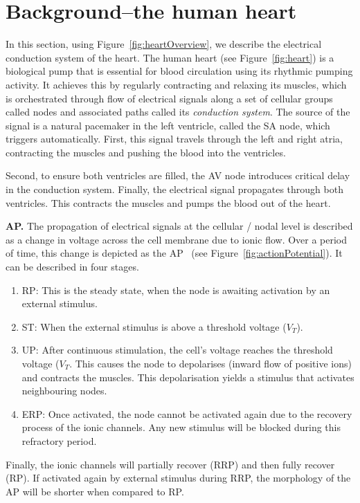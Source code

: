 \section{Background--the human heart }

In this section, using Figure~\ref{fig:heartOverview}, we describe the
electrical conduction system of the heart.
The human heart (see Figure~\ref{fig:heart}) is a biological pump that
is essential for blood circulation using its rhythmic pumping activity.
It achieves this by regularly contracting and relaxing its muscles,
which is orchestrated through flow of electrical signals along a set of
cellular groups called nodes and associated paths called its
\emph{conduction system}. The source of the signal is a natural pacemaker in the left ventricle, called the \ac{SA} node, which triggers
automatically. First, this signal travels through the left and right
atria, contracting the muscles and pushing the blood into the
ventricles.

Second, to ensure both ventricles are filled, the \ac{AV} node
introduces critical delay in the conduction system. Finally, the
electrical signal propagates through both ventricles. This contracts the
muscles and pumps the blood out of the heart.

\noindent \textbf{\acf{AP}.} The propagation of electrical signals at
the cellular / nodal level is described as a change in voltage across
the cell membrane due to ionic flow. Over a period of time, this change
is depicted as the \acf{AP}~\cite{chen14} (see 
Figure~\ref{fig:actionPotential}). It can be described in four
stages.
\begin{enumerate}
\item \acf{RP}: This is the steady state, when the node is awaiting
  activation by an external stimulus.
\item \acf{ST}: When the external stimulus is above a threshold voltage ($V_T$).
\item \acf{UP}: After continuous stimulation, the cell's voltage 
	reaches the threshold voltage ($V_T$. This causes   the node to
  depolarises (inward flow of positive ions) and contracts the
  muscles. This depolarisation yields a stimulus that activates
  neighbouring nodes.
\item \acf{ERP}: Once activated, the node cannot be activated again due
  to the recovery process of the ionic channels. Any new stimulus will
  be blocked during this refractory period.
\end{enumerate}
Finally, the ionic channels will partially
recover (\acf{RRP}) and then fully recover (\ac{RP}). 
If activated again by
external stimulus during \ac{RRP}, the morphology
of the \ac{AP} will be shorter when compared to \ac{RP}.

